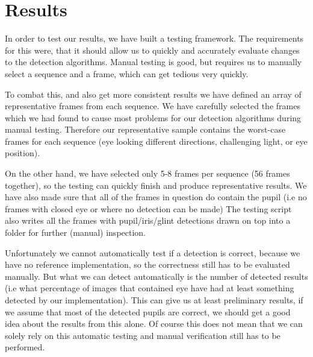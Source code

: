\section{Results}

In order to test our results, we have built a testing framework. The requirements for this were, that it should allow us to quickly and accurately evaluate changes to the detection algorithms. Manual testing is good, but requires us to manually select a sequence and a frame, which can get tedious very quickly.

To combat this, and also get more consistent results we have defined an array of representative frames from each sequence. We have carefully selected the frames which we had found to cause most problems for our detection algorithms during manual testing. Therefore our representative sample contains the worst-case frames for each sequence (eye looking different directions, challenging light, or eye position). 

On the other hand, we have selected only 5-8 frames per sequence (56 frames together), so the testing can quickly finish and produce representative results. We have also made sure that all of the frames in question do contain the pupil (i.e no frames with closed eye or where no detection can be made) The testing script also writes all the frames with pupil/iris/glint detections drawn on top into a folder for further (manual) inspection.

Unfortunately we cannot automatically test if a detection is correct, because we have no reference implementation, so the correctness still has to be evaluated manually. But what we can detect automatically is the number of detected results (i.e what percentage of images that contained eye have had at least something detected by our implementation). This can give us  at least preliminary results, if we assume that most of the detected pupils are correct, we should get a good idea about the results from this alone. Of course this does not mean that we can solely rely on this automatic testing and manual verification still has to be performed.

